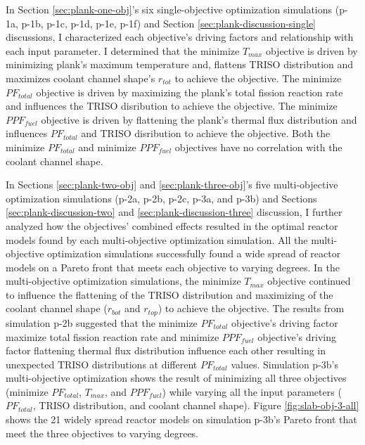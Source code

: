 In Section \ref{sec:plank-one-obj}'s six single-objective optimization simulations
(p-1a, p-1b, p-1c, p-1d, p-1e, p-1f) and Section \ref{sec:plank-discussion-single} 
discussions, I characterized each objective's driving factors and relationship 
with each input parameter. 
I determined that the minimize $T_{max}$ objective is driven by minimizing plank's maximum 
temperature and, flattens TRISO distribution and maximizes coolant channel shape's 
$r_{tot}$ to achieve the objective. 
The minimize $PF_{total}$ objective is driven by maximizing the plank's total fission 
reaction rate and influences the TRISO disribution to achieve the objective. 
The minimize $PPF_{fuel}$ objective is driven by flattening the plank's thermal flux
distribution and influences $PF_{total}$ and TRISO disribution to achieve the objective. 
Both the minimize $PF_{total}$ and minimize $PPF_{fuel}$ objectives have no correlation 
with the coolant channel shape. 

In Sections \ref{sec:plank-two-obj} and \ref{sec:plank-three-obj}'s five multi-objective 
optimization simulations (p-2a, p-2b, p-2c, p-3a, and p-3b) and Sections 
\ref{sec:plank-discussion-two} and \ref{sec:plank-discussion-three} discussion, 
I further analyzed how the objectives' combined effects resulted in the optimal 
reactor models found by each multi-objective optimization simulation. 
All the multi-objective optimization simulations successfully found a wide spread of 
reactor models on a Pareto front that meets each objective to varying degrees. 
In the multi-objective optimization simulations, the minimize $T_{max}$ objective 
continued to influence the flattening of the TRISO distribution and maximizing of the 
coolant channel shape ($r_{bot}$ and $r_{top}$) to achieve the objective. 
The results from simulation p-2b suggested that the minimize $PF_{total}$ 
objective's driving factor maximize total fission reaction rate and 
minimize $PPF_{fuel}$ objective's driving factor flattening thermal flux distribution 
influence each other resulting in unexpected TRISO distributions at different 
$PF_{total}$ values. 
Simulation p-3b's multi-objective optimization shows the result of minimizing all 
three objectives (minimize $PF_{total}$, $T_{max}$, and $PPF_{fuel}$) while varying 
all the input parameters ($PF_{total}$, TRISO distribution, and coolant channel shape).
Figure \ref{fig:slab-obj-3-all} shows the 21 widely spread reactor models on simulation 
p-3b's Pareto front that meet the three objectives to varying degrees. 

